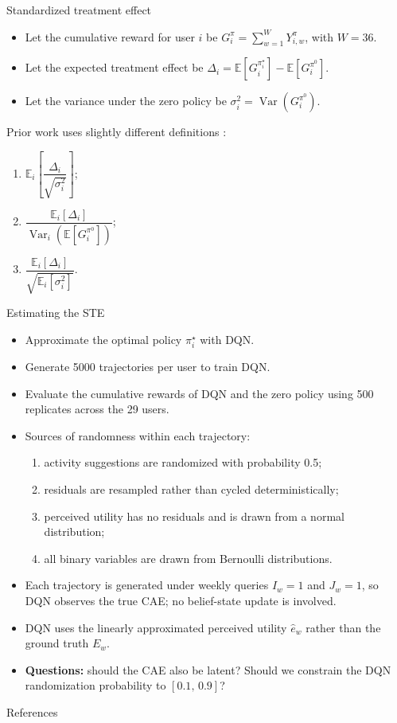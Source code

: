 \documentclass[10pt]{beamer}					%
\begin{document}
\begin{frame}{Standardized treatment effect}
    \begin{itemize}
        \item Let the cumulative reward for user $i$ be $G_i^{\pi} = \sum_{w=1}^{W} Y_{i,w}^{\pi}$, with $W=36$.
        \item Let the expected treatment effect be $\Delta_i = \mathbb{E}\!\left[G_i^{\pi_i^\star}\right] - \mathbb{E}\!\left[G_i^{\pi^0}\right]$.
        \item Let the variance under the zero policy be $\sigma_i^2 = \operatorname{Var}\!\left(G_i^{\pi^0}\right)$.
    \end{itemize}
    Prior work uses slightly different definitions \citep{gao25a,xu2025reinforcement}:
    \begin{enumerate}
        \item $\mathbb{E}_i\!\left[\dfrac{\Delta_i}{\sqrt{\sigma^2_i}}\right]$;
        \item $\dfrac{\mathbb{E}_i\left[\Delta_i\right]}{\operatorname{Var}_i\!\left(\mathbb{E}\left[G_i^{\pi^0}\right]\right)}$;
        \item $\dfrac{\mathbb{E}_i\left[\Delta_i\right]}{\sqrt{\mathbb{E}_i[\sigma^2_i]}}$.
    \end{enumerate}
\end{frame}

\begin{frame}{Estimating the STE}
    \begin{itemize}
        \item Approximate the optimal policy $\pi_i^\star$ with DQN.
        \item Generate 5000 trajectories per user to train DQN.
        \item Evaluate the cumulative rewards of DQN and the zero policy using 500 replicates across the 29 users.
        \item Sources of randomness within each trajectory:
        \begin{enumerate}
            \item activity suggestions are randomized with probability 0.5;
            \item residuals are resampled rather than cycled deterministically;
            \item perceived utility has no residuals and is drawn from a normal distribution;
            \item all binary variables are drawn from Bernoulli distributions.
        \end{enumerate}
        \item Each trajectory is generated under weekly queries $I_w=1$ and $J_w=1$, so DQN observes the true CAE; no belief-state update is involved.
        \item DQN uses the linearly approximated perceived utility $\widehat e_w$ rather than the ground truth $E_w$.
        \item \textbf{Questions:} should the CAE also be latent? Should we constrain the DQN randomization probability to $[0.1,\,0.9]$?
    \end{itemize}
\end{frame}

\begin{frame}{References}
    
    
\end{frame}
\end{document}
